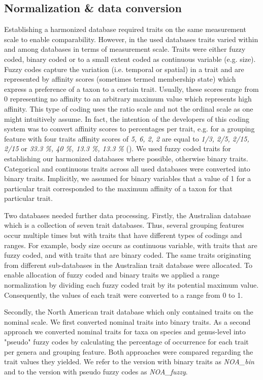 \documentclass{article}
\begin{document}
\subsection{Normalization \& data conversion}

Establishing a harmonized database required traits on the same measurement scale to 
enable comparability. However, in the used databases traits varied within and among databases 
in terms of measurement scale. Traits were either fuzzy coded, binary coded or 
to a small extent coded as continuous variable (e.g. size). Fuzzy codes capture the variation 
(i.e. temporal or spatial) in a trait and are represented by affinity scores 
(sometimes termed membership state) which express a preference of a taxon to a certain trait.
Usually, these scores range from 0 representing no affinity to an arbitrary maximum value which 
represents high affinity. This type of coding uses the ratio scale and not the ordinal
scale as one might intuitively assume. In fact, the intention of the developers of this 
coding system was to convert affinity scores to percentages per trait, e.g. 
for a grouping feature with four traits affinity scores of \textit{5, 6, 2, 2} are equal
to \textit{1/3, 2/5, 2/15, 2/15} or \textit{33.3 \%, 40 \%, 13.3 \%, 13.3 \%} (\cite{chevenet_francois_fuzzy_1994}).
We used fuzzy coded traits for establishing our harmonized databases where possible, otherwise binary traits. 
Categorical and continuous traits across all used databases were converted into binary traits. 
Implicitly, we assumed for binary variables that a value of 1 for a particular trait corresponded
to the maximum affinity of a taxon for that particular trait.

Two databases needed further data processing. Firstly, the Australian database which is a collection of seven trait databases. 
Thus, several grouping features occur multiple times but with traits that have different types of codings and ranges.
For example, body size occurs as continuous variable, with traits that are fuzzy coded, and with traits that are binary coded. 
The same traits originating from different sub-databases in the Australian trait database were allocated. 
To enable allocation of fuzzy coded and binary traits we applied a range normalization by dividing each fuzzy coded 
trait by its potential maximum value. Consequently, the values of each trait were converted to a range from 0 to 1.

Secondly, the North American trait database which only contained traits on the nominal scale. 
We first converted nominal traits into binary traits. As a second approach we converted nominal traits for taxa 
on species and genus-level into "pseudo" fuzzy codes by calculating the percentage of occurrence for each
trait per genera and grouping feature. Both approaches were compared regarding the trait values they yielded.
We refer to the version with binary traits as \textit{NOA\_bin} and to the version with pseudo fuzzy codes as 
\textit{NOA\_fuzzy}. 
\end{document}
